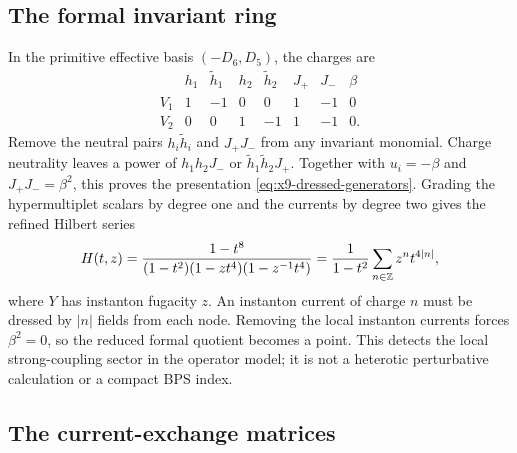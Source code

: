 \subsection{The formal invariant ring}
\label{subsec:x9-dressed-instantons}

In the primitive effective basis $(-D_6,D_5)$, the charges are
\begin{equation}
\begin{array}{c|rrrrrrr}
 &h_1&\widetilde h_1&h_2&\widetilde h_2&J_+&J_-&\beta\\\hline
 V_1&1&-1&0&0&1&-1&0\\
 V_2&0&0&1&-1&1&-1&0 .
\end{array}
\label{eq:x9-operator-charges}
\end{equation}
Remove the neutral pairs $h_i\widetilde h_i$ and $J_+J_-$
from any invariant monomial. Charge neutrality leaves a power
of $h_1h_2J_-$ or $\widetilde h_1\widetilde h_2J_+$.
Together with $u_i=-\beta$ and $J_+J_-=\beta^2$, this proves
the presentation \eqref{eq:x9-dressed-generators}. Grading the
hypermultiplet scalars by degree one and the currents by degree
two gives the refined Hilbert series
\begin{equation}
 H(t,z)=\frac{1-t^8}{(1-t^2)(1-zt^4)(1-z^{-1}t^4)}
       =\frac1{1-t^2}\sum_{n\in\mathbb Z}z^nt^{4|n|},
 \label{eq:x9-dressed-hilbert}
\end{equation}
where $Y$ has instanton fugacity $z$. An instanton current of
charge $n$ must be dressed by $|n|$ fields from each node.
Removing the local instanton currents forces $\beta^2=0$,
so the reduced formal quotient becomes a point. This detects
the local strong-coupling sector in the operator model; it is
not a heterotic perturbative calculation or a compact BPS index.



\subsection{The current-exchange matrices}

